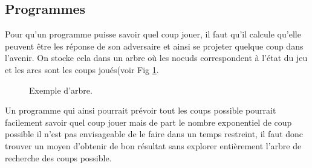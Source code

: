\documentclass[10pt,a4paper]{article}
\begin{document}
\subsection{Programmes}
Pour qu'un programme puisse savoir quel coup jouer, il faut qu'il calcule qu'elle peuvent être les réponse de son adversaire et ainsi se projeter quelque coup dans l'avenir. On stocke cela dans un arbre où les noeuds correspondent à l'état du jeu et les arcs sont les coups joués(voir Fig \ref{fig:exemple_arbre}.
  \begin{figure}[H]    
    \centering
     \caption {Exemple d'arbre.\label{fig:exemple_arbre} }
 \end{figure}
Un programme qui ainsi pourrait prévoir tout les coups possible pourrait facilement savoir quel coup jouer mais de part le nombre exponentiel de coup possible il n'est pas envisageable de le faire dans un temps restreint, il faut donc trouver un moyen d'obtenir de bon résultat sans explorer entièrement l'arbre de recherche des coups possible.
\end{document}
